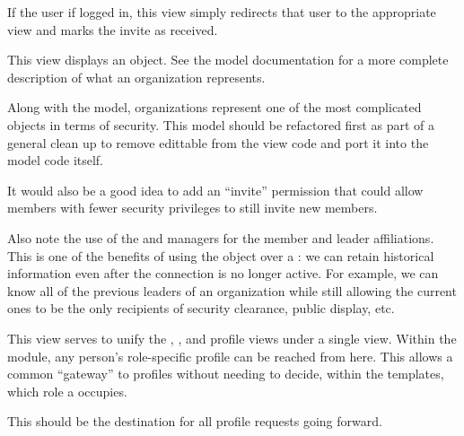 \documentclass[letterpaper,10pt,english]{sphinxmanual}
\begin{document}

\begin{fulllineitems}
\label{generated/apps.profiles.views:apps.profiles.views.view_invitation}
If the user if logged in, this view simply redirects that user to the
appropriate view and marks the invite as received.

\end{fulllineitems}



\begin{fulllineitems}
\label{generated/apps.profiles.views:apps.profiles.views.view_organization}
This view displays an  object.  See the model documentation
for a more complete description of what an organization represents.

Along with the  model, organizations represent one of the most
complicated objects in terms of security.  This model should be refactored first
as part of a general clean up to remove edittable from the view code and port
it into the model code itself.

It would also be a good idea to add an ``invite'' permission that could allow
members with fewer security privileges to still invite new members.

Also note the use of the  and  managers for the member
and leader affiliations.  This is one of the benefits of using the 
 object over a : we can retain historical
information even after the connection is no longer active.  For example, 
we can know all of the previous leaders of an organization while still allowing 
the current ones to be the only recipients of security clearance, public display,
etc.

\end{fulllineitems}



\begin{fulllineitems}
\label{generated/apps.profiles.views:apps.profiles.views.view_person_profile}
This view serves to unify the , , and 
profile views under a single view.  Within the  module, any person's
role-specific profile can be reached from here.  This allows a common
``gateway'' to profiles without needing to decide, within the templates,
which role a  occupies.

This should be the destination for all profile requests going forward.

\end{fulllineitems}
\end{document}
